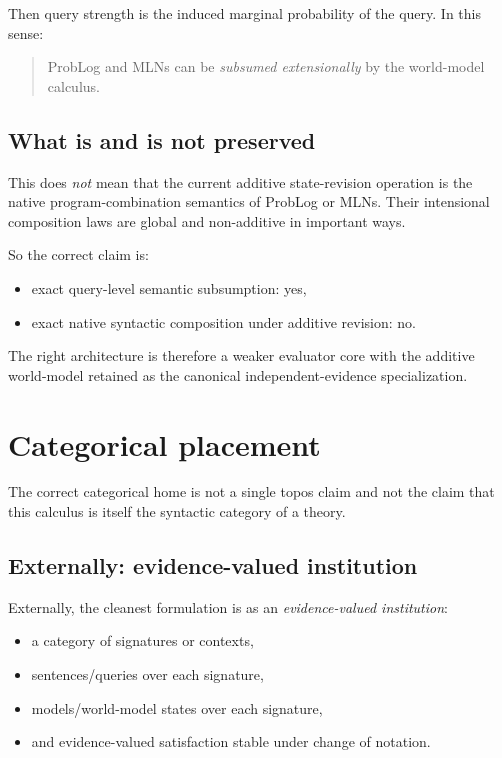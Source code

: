 \documentclass[11pt]{article}
\begin{document}
Then query strength is the induced marginal probability of the query.  In this
sense:
\begin{quote}
ProbLog and MLNs can be \emph{subsumed extensionally} by the world-model
calculus.
\end{quote}

\subsection{What is and is not preserved}

This does \emph{not} mean that the current additive state-revision operation is
the native program-combination semantics of ProbLog or MLNs.  Their intensional
composition laws are global and non-additive in important ways.

So the correct claim is:
\begin{itemize}
  \item exact query-level semantic subsumption: yes,
  \item exact native syntactic composition under additive revision: no.
\end{itemize}

The right architecture is therefore a weaker evaluator core with the additive
world-model retained as the canonical independent-evidence specialization.

\section{Categorical placement}

The correct categorical home is not a single topos claim and not the claim that
this calculus is itself the syntactic category of a theory.

\subsection{Externally: evidence-valued institution}

Externally, the cleanest formulation is as an \emph{evidence-valued
institution}:
\begin{itemize}
  \item a category of signatures or contexts,
  \item sentences/queries over each signature,
  \item models/world-model states over each signature,
  \item and evidence-valued satisfaction stable under change of notation.
\end{itemize}
\end{document}
